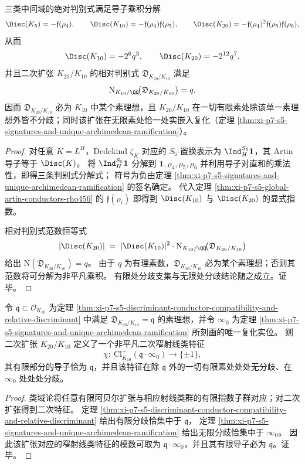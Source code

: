\begin{theorem}\label{thm:xi-p7-s5-discriminant-conductor-compatibility-and-relative-discriminant}
三类中间域的绝对判别式满足导子乘积分解
\[
\Disc(K_{5})=-\mathfrak f(\rho_4),\qquad
\Disc(K_{10})=-\mathfrak f(\rho_4)\mathfrak f(\rho_5),\qquad
\Disc(K_{20})=-\mathfrak f(\rho_4)^2\mathfrak f(\rho_5)\mathfrak f(\rho_6),
\]
从而
\[
\Disc(K_{10})=-2^{6}q^{3},\qquad
\Disc(K_{20})=-2^{12}q^{7}.
\]
并且二次扩张 \(K_{20}/K_{10}\) 的相对判别式 \(\mathfrak D_{K_{20}/K_{10}}\) 满足
\[
\mathrm N_{K_{10}/\QQ}\!\bigl(\mathfrak D_{K_{20}/K_{10}}\bigr)=q.
\]
因而 \(\mathfrak D_{K_{20}/K_{10}}\) 必为 \(K_{10}\) 中某个素理想，且 \(K_{20}/K_{10}\) 在一切有限素处除该单一素理想外皆不分歧；同时该扩张在无限素处恰一处实嵌入复化（定理 \ref{thm:xi-p7-s5-signatures-and-unique-archimedean-ramification}）。
\end{theorem}
\begin{proof}
对任意 \(K=L^H\)，Dedekind \(\zeta_K\) 对应的 \(S_5\)-置换表示为 \(\Ind_H^{S_5}\mathbf 1\)，其 Artin 导子等于 \(\Disc(K)\)。
将 \(\Ind_H^{S_5}\mathbf 1\) 分解到 \(\mathbf 1,\rho_4,\rho_5,\rho_6\) 并利用导子对直和的乘法性，即得三条判别式分解式；
符号为负由定理 \ref{thm:xi-p7-s5-signatures-and-unique-archimedean-ramification} 的签名确定。
代入定理 \ref{thm:xi-p7-s5-global-artin-conductors-rho456} 的 \(\mathfrak f(\rho_i)\) 即得到 \(\Disc(K_{10})\) 与 \(\Disc(K_{20})\) 的显式指数。
\par
相对判别式范数恒等式
\[
|\Disc(K_{20})|
\;=\;
|\Disc(K_{10})|^{2}\cdot \mathrm N_{K_{10}/\QQ}\!\bigl(\mathfrak D_{K_{20}/K_{10}}\bigr)
\]
给出 \(\mathrm N(\mathfrak D_{K_{20}/K_{10}})=q\)。
由于 \(q\) 为有理素数，\(\mathfrak D_{K_{20}/K_{10}}\) 必为某个素理想；否则其范数将可分解为非平凡乘积。
有限处分歧支集与无限处分歧结论随之成立。证毕。
\end{proof}

\begin{conclusion}[二次扩张的窄射线类特征与分歧模数的极简性]\label{con:xi-p7-s5-narrow-ray-class-character}
令 \(\mathfrak q\subset\mathcal O_{K_{10}}\) 为定理 \ref{thm:xi-p7-s5-discriminant-conductor-compatibility-and-relative-discriminant} 中满足 \(\mathfrak D_{K_{20}/K_{10}}=\mathfrak q\) 的素理想，并令 \(\infty_{0}\) 为定理 \ref{thm:xi-p7-s5-signatures-and-unique-archimedean-ramification} 所刻画的唯一复化实位。
则二次扩张 \(K_{20}/K_{10}\) 定义了一个非平凡二次窄射线类特征
\[
\chi:\ \mathrm{Cl}^{+}_{K_{10}}(\mathfrak q\cdot \infty_{0})\longrightarrow \{\pm 1\},
\]
其有限部分的导子恰为 \(\mathfrak q\)，并且该特征在除 \(\mathfrak q\) 外的一切有限素处处处无分歧、在 \(\infty_{0}\) 处处处分歧。
\end{conclusion}
\begin{proof}
类域论将任意有限阿贝尔扩张与相应射线类群的有限指数子群对应；对二次扩张得到二次特征。
定理 \ref{thm:xi-p7-s5-discriminant-conductor-compatibility-and-relative-discriminant} 给出有限分歧恰集中于 \(\mathfrak q\)，
定理 \ref{thm:xi-p7-s5-signatures-and-unique-archimedean-ramification} 给出无限分歧恰集中于 \(\infty_0\)。
因此该扩张对应的窄射线类特征的模数可取为 \(\mathfrak q\cdot \infty_{0}\)，并且其有限导子必为 \(\mathfrak q\)。证毕。
\end{proof}

